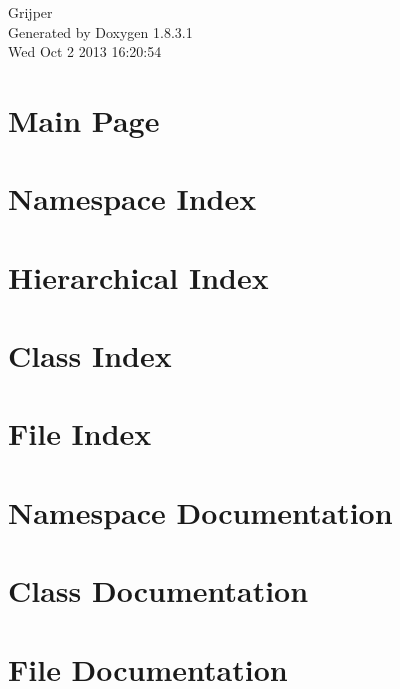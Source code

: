 \documentclass{book}
\begin{document}
\begin{titlepage}
\vspace*{7cm}
\begin{center}
{\Large Grijper }\\
\vspace*{1cm}
{\large Generated by Doxygen 1.8.3.1}\\
\vspace*{0.5cm}
{\small Wed Oct 2 2013 16:20:54}\\
\end{center}
\end{titlepage}
\clearemptydoublepage
{}
\tableofcontents
\clearemptydoublepage
{}
\chapter{Main Page}
\label{index}
\chapter{Namespace Index}

\chapter{Hierarchical Index}

\chapter{Class Index}

\chapter{File Index}

\chapter{Namespace Documentation}





\chapter{Class Documentation}








\chapter{File Documentation}








\printindex
\end{document}
